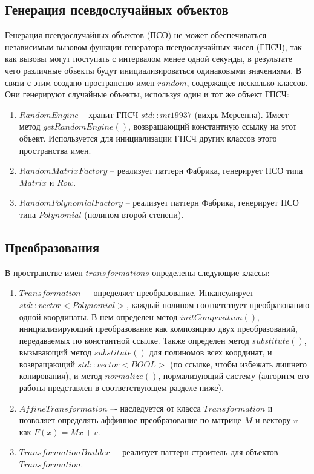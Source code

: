 \subsection{Генерация псевдослучайных объектов} \label{ch2:subsec-title-abbr} %

Генерация псевдослучайных объектов (ПСО) не может обеспечиваться независимым вызовом функции-генератора псевдослучайных чисел (ГПСЧ), так как вызовы могут поступать с интервалом менее одной секунды, в результате чего различные объекты будут инициализироваться одинаковыми значениями. В связи с этим создано пространство имен \(random\), содержащее несколько классов. Они генерируют случайные объекты, используя один и тот же объект ГПСЧ:
\begin{enumerate}[1.]
	\item \(RandomEngine\) -- хранит ГПСЧ \(std::mt19937\) (вихрь Мерсенна). Имеет метод \(getRandomEngine()\), возвращающий константную ссылку на этот объект. Используется для инициализации ГПСЧ других классов этого пространства имен.
	\item \(RandomMatrixFactory\) -- реализует паттерн Фабрика, генерирует ПСО типа \(Matrix\) и \(Row\).
	\item \(RandomPolynomialFactory\) -- реализует паттерн Фабрика, генерирует ПСО типа \(Polynomial\) (полином второй степени).
\end{enumerate} 


\subsection{Преобразования} \label{ch2:subsec-title-abbr} %

В пространстве имен \(transformations\) определены следующие классы:
\begin{enumerate}[1.]
	\item \(Transformation\) –- определяет преобразование. Инкапсулирует \(std::vector<Polynomial>\), каждый полином соответствует преобразованию одной координаты. В нем определен метод \(initComposition()\), инициализирующий преобразование как композицию двух преобразований, передаваемых по константной ссылке. Также определен метод \(substitute()\), вызывающий метод \(substitute()\) для полиномов всех координат, и возвращающий \(std::vector<BOOL>\) (по ссылке, чтобы избежать лишнего копирования), и метод \(normalize()\), нормализующий систему (алгоритм его работы представлен в соответствующем разделе ниже).
	\item \(AffineTransformation\) –- наследуется от класса \(Transformation\) и позволяет определять аффинное преобразование по матрице \(M\) и вектору \(v\) как \(F(x) = Mx + v\).
	\item \(TransformationBuilder\) –- реализует паттерн строитель для объектов \(Transformation\).
\end{enumerate} 


